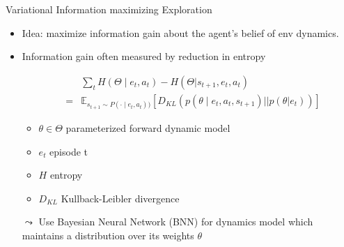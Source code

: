\begin{frame}[c]{Variational Information maximizing Exploration\newline {}}
	
	\begin{itemize}
		\item Idea: maximize information gain about the agent's belief of env dynamics.
		\item Information gain often measured by reduction in entropy
		
		\begin{eqnarray}
		&&\sum_t H(\Theta \mid e_t, a_t) - H(\Theta | s_{t+1}, e_t, a_t)\nonumber\\
		&=& \mathbb{E}_{s_{t+1}\sim P(\cdot\mid e_t, a_t))} \left[ D_{KL} (p(\theta \mid e_t, a_t, s_{t+1}) || p(\theta|e_t))  \right]\nonumber
		\end{eqnarray}
		
		\begin{itemize}
			\item $\theta \in \Theta$ parameterized forward dynamic model
			\item $e_t$ episode t
			\item $H$ entropy
			\item $D_{KL}$ Kullback-Leibler divergence
		\end{itemize}
	
		\item[$\leadsto$] Use Bayesian Neural Network (BNN) for dynamics model which maintains a distribution over its weights $\theta$
		
	\end{itemize}


	
	
\end{frame}

